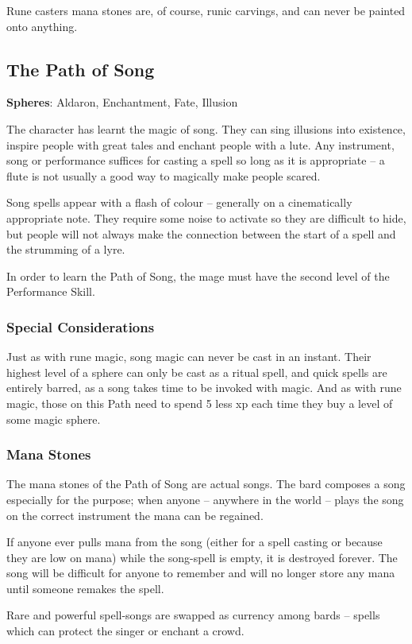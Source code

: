 \begin{multicols}{2}
Rune casters mana stones are, of course, runic carvings, and can never be painted onto anything.

\subsection{The Path of Song}

\label{song}\textbf{Spheres}: Aldaron, Enchantment, Fate, Illusion

The character has learnt the magic of song. They can sing illusions into existence, inspire people with great tales and enchant people with a lute. Any instrument, song or performance suffices for casting a spell so long as it is appropriate -- a flute is not usually a good way to magically make people scared.

Song spells appear with a flash of colour -- generally on a cinematically appropriate note. They require some noise to activate so they are difficult to hide, but people will not always make the connection between the start of a spell and the strumming of a lyre.

In order to learn the Path of Song, the mage must have the second level of the Performance Skill. 

\subsubsection{Special Considerations}

Just as with rune magic, song magic can never be cast in an instant.  Their highest level of a sphere can only be cast as a ritual spell, and quick spells are entirely barred, as a song takes time to be invoked with magic.  And as with rune magic, those on this Path need to spend 5 less \gls{xp} each time they buy a level of some magic sphere.

\subsubsection{Mana Stones}

The mana stones of the Path of Song are actual songs.
The bard composes a song especially for the purpose; when anyone -- anywhere in the world -- plays the song on the correct instrument the mana can be regained.

If anyone ever pulls mana from the song (either for a spell casting or because they are low on mana) while the song-spell is empty, it is destroyed forever.
The song will be difficult for anyone to remember and will no longer store any mana until someone remakes the spell.

Rare and powerful spell-songs are swapped as currency among bards -- spells which can protect the singer or enchant a crowd.

\end{multicols}

